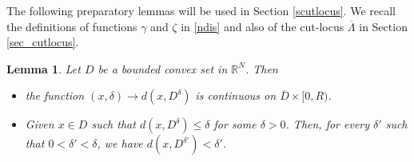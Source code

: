 \documentclass[reqno,11pt]{amsart}
\newtheorem{lemma}[theorem]{Lemma}
\theoremstyle{definition}
\numberwithin{equation}{section}
\def\ov{\overline}
\newcommand{\RR}{\mathbb{R}}
\newcommand{\tinm}[1]{\text{\;#1\;}}
\newcommand{\1}{{{\bf 1}\kern-0,28em\rm l}}
\def\proj{\Pi}
\begin{document}
The following preparatory lemmas will be used in Section \ref{scutlocus}.
We recall the definitions of functions $\gamma$ and $\zeta$ in \eqref{ndis} and also of the cut-locus  $\ov\Lambda$ in Section \ref{sec_cutlocus}.

\begin{lemma}\label{stmonotone}
Let $D$ be a bounded convex set in $\RR^N$. Then
\begin{itemize}[leftmargin=5mm]
\item[(i)] the function $(x,\delta) \to   d(x, D^\delta)$ is continuous on $\ov D  \times [0,R)$. 
 
 \item [(ii)] Given $x\in D$ such that $d(x,D^\delta)\le \delta$ for some $\delta>0$. Then, for every $\delta'$ such that $0<\delta' < \delta$, we have $d(x,D^{\delta'}) < \delta'$.
\end{itemize}
\end{lemma}
\end{document}
